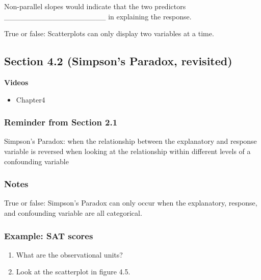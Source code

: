 \documentclass[
]{report}
\providecommand{\tightlist}{%
  \setlength{\itemsep}{0pt}\setlength{\parskip}{0pt}}
\newcommand{\rgs}{\vspace{12pt}} %
\newcommand{\rgi}{\hspace{24pt}}  %
\begin{document}
\rgi Non-parallel slopes would indicate that the two predictors \_\_\_\_\_\_\_\_\_\_\_\_\_\_\_\_\_\_\_ in explaining the response.

True or false: Scatterplots can only display two variables at a time.

\hypertarget{section-4.2-simpsons-paradox-revisited}{%
\subsection*{Section 4.2 (Simpson's Paradox, revisited)}\label{section-4.2-simpsons-paradox-revisited}}


\textbf{Videos}

\begin{itemize}
\tightlist
\item
  Chapter4
\end{itemize}


\hypertarget{reminder-from-section-2.1}{%
\subsubsection*{Reminder from Section 2.1}\label{reminder-from-section-2.1}}

Simpson's Paradox: when the relationship between the explanatory and response variable is reversed when looking at the relationship within different levels of a confounding variable

\hypertarget{notes-13}{%
\subsubsection*{Notes}\label{notes-13}}

True or false: Simpson's Paradox can only occur when the explanatory, response, and confounding variable are all categorical.

\hypertarget{example-sat-scores}{%
\subsubsection*{Example: SAT scores}\label{example-sat-scores}}

\begin{enumerate}
\def\labelenumi{\arabic{enumi}.}
\item
  What are the observational units?\\
  \rgs
\item
  Look at the scatterplot in figure 4.5.
\end{enumerate}
\end{document}
